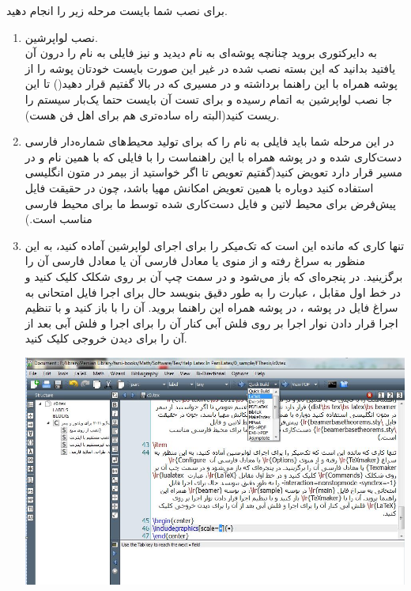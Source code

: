 برای نصب شما بایست  مرحله زیر را انجام دهید.
\begin{enumerate}
\item
نصب لواپرشین.\\
به دایرکتوری  بروید چنانچه پوشه‌ای به نام  دیدید و نیز فایلی به نام  را درون آن یافتید بدانید که این بسته نصب شده در غیر این صورت بایست خودتان پوشه  را از پوشه  همراه با این راهنما برداشته و در مسیری که در بالا گفتیم قرار دهید() تا این جا نصب لواپرشین به اتمام رسیده و برای تست آن بایست حتما یک‌بار سیستم را ریست کنید(البته راه ساده‌تری هم برای اهل فن هست).
\item
در این مرحله شما باید فایلی به نام  را که برای تولید محیط‌های شماره‌دار فارسی دست‌کاری شده و در پوشه  همراه با این راهنماست را با فایلی که با همین نام و در مسیر  قرار دارد تعویض کنید(گفتیم تعویص تا اگر خواستید از بیمر در متون انگلیسی استفاده کنید دوباره با همین تعویض امکانش مهیا باشد، چون در حقیقت فایل  پیش‌فرض برای محیط لاتین و فایل  دست‌کاری شده توسط ما برای محیط فارسی مناسب است.)
\item
تنها کاری که مانده این است که تک‌میکر را برای اجرای لواپرشین آماده کنید، به این منظور به سراغ  رفته و از منوی  یا معادل فارسی آن  یا معادل فارسی آن را برگزینید. در پنجره‌ای که باز می‌شود و در سمت چپ آن بر روی شکلک  کلیک کنید و در خط اول مقابل ، عبارت \hbox{} را به طور دقیق بنویسد حال برای اجرا فایل امتحانی به سراغ فایل  در پوشه ، در پوشه  همراه این راهنما بروید. آن را با  باز کنید و با تنظیم اجرا قرار دادن نوار اجرا بر روی  فلش آبی کنار آن را برای اجرا و فلش آبی بعد از آن را برای دیدن خروجی کلیک کنید.
\begin{center}
\includegraphics[scale=.3]{fig/beamer}
\end{center}
\end{enumerate}
